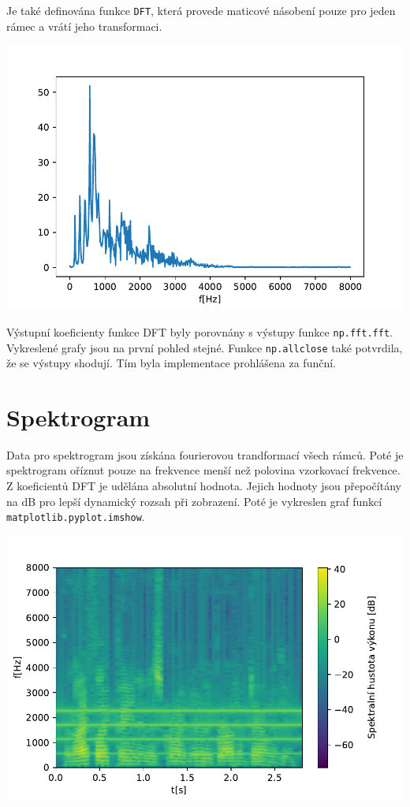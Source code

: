 \documentclass[12pt,a4paper]{article}
\begin{document}
		
		Je také definována funkce \texttt{DFT}, která provede maticové násobení pouze pro jeden rámec a vrátí jeho transformaci.
		
		\includegraphics{img/DFT.pdf}
		
		Výstupní koeficienty funkce DFT byly porovnány s výstupy funkce \texttt{np.fft.fft}.
		Vykreslené grafy jsou na první pohled stejné. 
		Funkce \texttt{np.allclose} také potvrdila, že se výstupy shodují. 
		Tím byla implementace prohlášena za funční.
		
		\newpage
	
	
	\section{Spektrogram}
		Data pro spektrogram jsou získána fourierovou trandformací všech rámců.
		Poté je spektrogram oříznut pouze na frekvence menší než polovina vzorkovací frekvence.
		Z koeficientů DFT je udělána absolutní hodnota. 
		Jejich hodnoty jsou přepočítány na dB pro lepší dynamický rozsah při zobrazení.
		Poté je vykreslen graf funkcí \texttt{matplotlib.pyplot.imshow}.
		
		\includegraphics{img/spectrogram.pdf}
		
\end{document}
